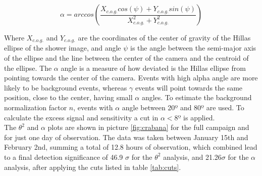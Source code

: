 \documentclass[main.tex]{subfiles}
\begin{document}
\begin{equation}
  \alpha = arc cos\left(\frac{X_{c.o.g.}cos(\psi) + Y_{c.o.g.} sin(\psi)}{X_{c.o.g.}^2 + Y_{c.o.g.}^2}\right)
\end{equation}

Where $X_{c.o.g.}$ and $Y_{c.o.g.}$ are the coordinates of the center of gravity of the Hillas ellipse of the shower image, and angle $\psi$ is the angle between the semi-major axis of the ellipse and the line between the center of the camera and the centroid of the ellipse. The $\alpha$ angle is a measure of how deviated is the Hillas ellipse from pointing towards the center of the camera. Events with high alpha angle are more likely to be background events, whereas $\gamma$ events will point towards the same position, close to the center, having small $\alpha$ angles. To estimate the background normalization factor $n$, events with $\alpha$ angle between 20º and 80º are used. To calculate the excess signal and sensitivity a cut in $\alpha < 8º$ is applied.\\

The $\theta^2$ and $\alpha$ plots are shown in picture \ref{fig:crabana} for the full campaign and for just one day of observation. The data was taken between January 15th and February 2nd, summing a total of 12.8 hours of observation, which combined lead to a final detection significance of 46.9 $\sigma$ for the $\theta^2$ analysis, and 21.26$\sigma$ for the $\alpha$ analysis, after applying the cuts listed in table \ref{tab:cuts}. 
\end{document}
